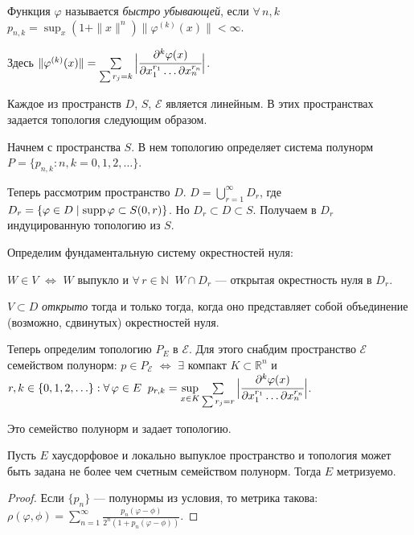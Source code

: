 \documentclass[10pt,titlepage, a4paper]{article}
\begin{document}
\begin{defen}
Функция $\varphi$ называется \emph{быстро убывающей}, если
$\forall\,
n,k$\;\;$p_{n,k}=\sup_x(1+\|x\|^n)\|\varphi^{(k)}(x)\|<\infty$.
\end{defen}

\begin{defen}
Здесь $\|\varphi^{(k)}(x)\|=\sum\limits_{\sum
r_j=k}\Big|\cfrac{\partial^k\varphi(x)}{\partial x^{r_1}_{1 } \ldots
\partial  x^{r_n}_{n }}\Big|$.
\end{defen}

Каждое из пространств $D$, $S$, $\mathcal{E}$ является линейным. В
этих пространствах задается топология следующим образом.

Начнем с пространства $S$. В нем топологию определяет система
полунорм $P=\{p_{n,k}: n,k=0,1,2,\ldots\}$.

Теперь рассмотрим пространство $D$.
$D=\bigcup\limits_{r=1}^{\infty}D_r$, где $D_{r}=\{\varphi\in D\mid
\mathop{\mathrm{supp}} \varphi\subset S(0,r)\}$. Но $D_r \subset D\subset S$.
Получаем в $D_r$ индуцированную топологию из $S$.

Определим фундаментальную систему окрестностей нуля:

$W\in V$ $\Leftrightarrow$ $W$ выпукло и $\forall\, r\in
\mathbb{N}\;\; W\cap D_r$ --- открытая окрестность нуля в $D_r$.

\begin{defen}
$V\subset D$ \emph{открыто} тогда и только тогда, когда оно
представляет собой объединение (возможно, сдвинутых) окрестностей
нуля.
\end{defen}

Теперь определим топологию $P_E$ в $\mathcal{E}$. Для этого снабдим
пространство $\mathcal{E}$ семейством полунорм: $p\in P_\mathcal{E}$
$\Leftrightarrow$ $\exists$ компакт $K\subset \mathbb{R}^n$ и
$r,k\p\in \{0,1,2,\ldots\}: \forall\, \varphi \in E\;\;
p_{r,k}=\sup\limits_{x\in K}\sum\limits_{\sum
r_j=r}\Big|\cfrac{\partial^k\varphi(x)}{\partial x^{r_1}_{1 } \ldots
\partial  x^{r_n}_{n }}\Big|$.

Это семейство полунорм и задает топологию.

\begin{theorem}
Пусть $E$ хаусдорфовое и локально выпуклое пространство и топология
может быть задана не более чем счетным семейством полунорм. Тогда
$E$ метризуемо.
\end{theorem}

\begin{proof}
Если $\{p_n\}$ --- полунормы из условия, то метрика такова:
$\rho(\varphi,\phi)=\sum_{n=1}^{\infty}\frac{p_n(\varphi-\phi)}{2^n(1+p_n(\varphi-\phi))}$.
\end{proof}
\end{document}
